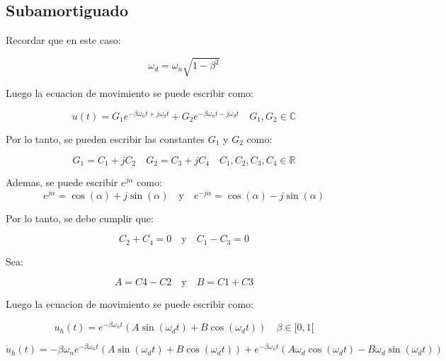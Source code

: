 \documentclass{article}  %
\begin{document}
\subsection{Subamortiguado}

Recordar que en este caso:

\begin{equation}
    \omega_d = \omega_n \sqrt{1 - \beta^2}
\end{equation}

Luego la ecuacion de movimiento se puede escribir como:

\begin{equation}
    u(t) = G_1 e^{-\beta \omega_n t + j \omega_d t} + G_2 e^{-\beta \omega_n t - j \omega_d t} \quad G_1, G_2 \in \mathbb{C}
\end{equation}

Por lo tanto, se pueden escribir las constantes $G_1$ y $G_2$ como:

\begin{equation}
    G_1 = C_1 + jC_2 \quad G_2 = C_3 + jC_4 \quad C_1, C_2, C_3, C_4 \in \mathbb{R}
\end{equation}

Ademas, se puede escribir $e^{j\alpha}$ como:
\begin{equation}
    e^{j\alpha} = \cos(\alpha) + j\sin(\alpha) \quad \text{y} \quad e^{-j\alpha} = \cos(\alpha) - j\sin(\alpha)
\end{equation}

Por lo tanto, se debe cumplir que:

\begin{equation}
    C_2 + C_4 = 0 \quad \text{y} \quad C_1 - C_3 = 0
\end{equation}

Sea:

\begin{equation}
    A = C4 - C2 \quad \text{y} \quad B = C1 + C3
\end{equation}

Luego la ecuacion de movimiento se puede escribir como:

\begin{equation}
    u_h(t) = e^{-\beta \omega_n t} (A \sin(\omega_d t) + B \cos(\omega_d t)) \quad \beta \in [0, 1[
\end{equation}

\begin{equation}
    \dot{u}_h(t) = -\beta \omega_n e^{-\beta \omega_n t} (A \sin(\omega_d t) + B \cos(\omega_d t)) + e^{-\beta \omega_n t} (A \omega_d \cos(\omega_d t) - B \omega_d \sin(\omega_d t))
\end{equation}
\end{document}
